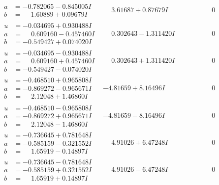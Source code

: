 \documentclass[1p]{elsarticle_modified}
\theoremstyle{definition}
\begin{document}
$$\begin{array}{c|c|c}
\begin{aligned}
a &= -0.782065 - 0.845005 I \\
b &= \phantom{-}1.60889 + 0.09679 I\end{aligned}
 & \phantom{-}3.61687 + 0.87679 I & \phantom{-0.000000 } 0 \\ \hline\begin{aligned}
u &= -0.034695 + 0.930488 I \\
a &= \phantom{-}0.609160 - 0.457460 I \\
b &= -0.549427 + 0.074020 I\end{aligned}
 & \phantom{-}0.302643 - 1.311420 I & \phantom{-0.000000 } 0 \\ \hline\begin{aligned}
u &= -0.034695 - 0.930488 I \\
a &= \phantom{-}0.609160 + 0.457460 I \\
b &= -0.549427 - 0.074020 I\end{aligned}
 & \phantom{-}0.302643 + 1.311420 I & \phantom{-0.000000 } 0 \\ \hline\begin{aligned}
u &= -0.468510 + 0.965808 I \\
a &= -0.869272 - 0.965671 I \\
b &= \phantom{-}2.12048 + 1.46860 I\end{aligned}
 & -4.81659 + 8.16496 I & \phantom{-0.000000 } 0 \\ \hline\begin{aligned}
u &= -0.468510 - 0.965808 I \\
a &= -0.869272 + 0.965671 I \\
b &= \phantom{-}2.12048 - 1.46860 I\end{aligned}
 & -4.81659 - 8.16496 I & \phantom{-0.000000 } 0 \\ \hline\begin{aligned}
u &= -0.736645 + 0.781648 I \\
a &= -0.585159 - 0.321552 I \\
b &= \phantom{-}1.65919 - 0.14897 I\end{aligned}
 & \phantom{-}4.91026 + 6.47248 I & \phantom{-0.000000 } 0 \\ \hline\begin{aligned}
u &= -0.736645 - 0.781648 I \\
a &= -0.585159 + 0.321552 I \\
b &= \phantom{-}1.65919 + 0.14897 I\end{aligned}
 & \phantom{-}4.91026 - 6.47248 I & \phantom{-0.000000 } 0 \\ \hline\begin{aligned}

\end{aligned}
\end{array}$$
\end{document}
